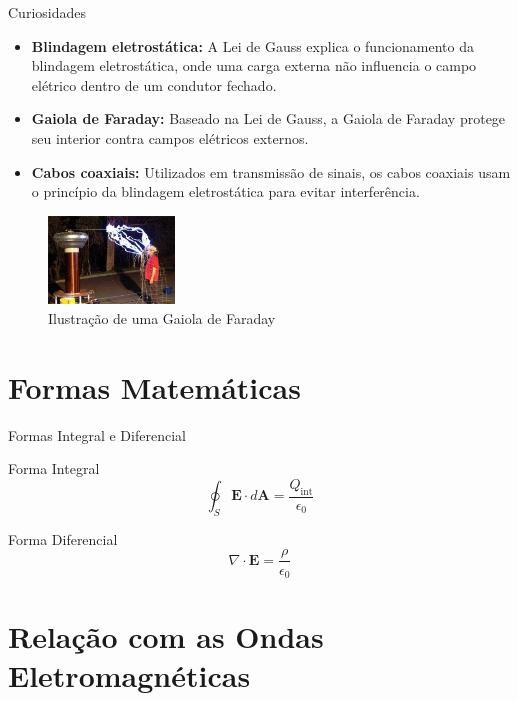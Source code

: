 \documentclass{beamer}
\begin{document}
  \begin{frame}{Curiosidades}
  \begin{itemize}
      \item \textbf{Blindagem eletrostática:} A Lei de Gauss explica o funcionamento da blindagem eletrostática, onde uma carga externa não influencia o campo elétrico dentro de um condutor fechado.
      \item \textbf{Gaiola de Faraday:} Baseado na Lei de Gauss, a Gaiola de Faraday protege seu interior contra campos elétricos externos.
      \item \textbf{Cabos coaxiais:} Utilizados em transmissão de sinais, os cabos coaxiais usam o princípio da blindagem eletrostática para evitar interferência.
  \end{itemize}
  
  \begin{figure}
  \centering
  \includegraphics[width=0.3\textwidth]{images/gaiola_faraday.png}
  \caption{Ilustração de uma Gaiola de Faraday}
  \end{figure}
  
  \end{frame}
  
  \section{Formas Matemáticas}
  
  \begin{frame}{Formas Integral e Diferencial}
  \begin{block}{Forma Integral}
  \[
  \oint_S \mathbf{E} \cdot d\mathbf{A} = \frac{Q_{\text{int}}}{\epsilon_0}
  \]
  \end{block}
  
  \begin{block}{Forma Diferencial}
  \[
  \nabla \cdot \mathbf{E} = \frac{\rho}{\epsilon_0}
  \]
  \end{block}
  
  \end{frame}
  
  \section{Relação com as Ondas Eletromagnéticas}
  
\end{document}
